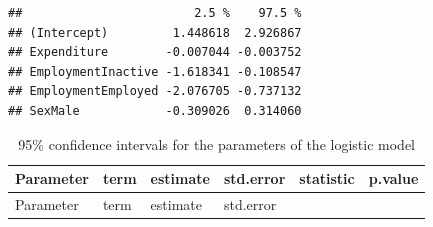 \documentclass[
  english,
  12pt,
]{book}
\begin{document}
\begin{verbatim}
##                        2.5 %    97.5 %
## (Intercept)         1.448618  2.926867
## Expenditure        -0.007044 -0.003752
## EmploymentInactive -1.618341 -0.108547
## EmploymentEmployed -2.076705 -0.737132
## SexMale            -0.309026  0.314060
\end{verbatim}

\begin{longtable}[]{@{}
  >{\raggedright\arraybackslash}p{}
  >{\centering\arraybackslash}p{}
  >{\centering\arraybackslash}p{}
  >{\centering\arraybackslash}p{}
  >{\centering\arraybackslash}p{}
  >{\centering\arraybackslash}p{}@{}}
\caption{\label{tab:tab-ic-logistica}95\% confidence intervals for the parameters of the logistic model}\tabularnewline
\toprule\noalign{}
\begin{minipage}[b]{\linewidth}\raggedright
Parameter
\end{minipage} & \begin{minipage}[b]{\linewidth}\centering
term
\end{minipage} & \begin{minipage}[b]{\linewidth}\centering
estimate
\end{minipage} & \begin{minipage}[b]{\linewidth}\centering
std.error
\end{minipage} & \begin{minipage}[b]{\linewidth}\centering
statistic
\end{minipage} & \begin{minipage}[b]{\linewidth}\centering
p.value
\end{minipage} \\
\midrule\noalign{}
\endfirsthead
\toprule\noalign{}
\begin{minipage}[b]{\linewidth}\raggedright
Parameter
\end{minipage} & \begin{minipage}[b]{\linewidth}\centering
term
\end{minipage} & \begin{minipage}[b]{\linewidth}\centering
estimate
\end{minipage} & \begin{minipage}[b]{\linewidth}\centering
std.error
\end{minipage} & \begin{minipage}[b]{\linewidth}\centering

\end{minipage}
\end{longtable}
\end{document}
